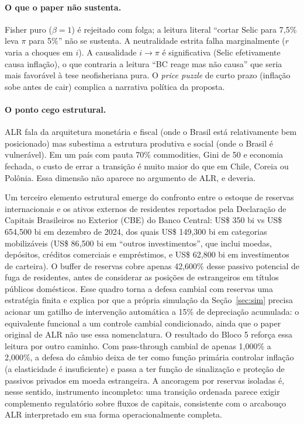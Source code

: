 \documentclass[11pt,a4paper]{article}
\begin{document}
\paragraph{O que o paper não sustenta.} Fisher puro ($\beta = 1$) é
rejeitado com folga; a leitura literal ``cortar Selic para 7{,}5\%
leva $\pi$ para 5\%'' não se sustenta. A neutralidade estrita falha
marginalmente ($r$ varia a choques em $i$). A causalidade $i \to \pi$
é significativa (Selic efetivamente causa inflação), o que contraria a
leitura ``BC reage mas não causa'' que seria mais favorável à tese
neofisheriana pura. O \emph{price puzzle} de curto prazo (inflação sobe
antes de cair) complica a narrativa política da proposta.

\paragraph{O ponto cego estrutural.} ALR fala da arquitetura monetária e
fiscal (onde o Brasil está relativamente bem posicionado) mas subestima
a estrutura produtiva e social (onde o Brasil é vulnerável). Em um país
com pauta 70\% commodities, Gini de 50 e economia fechada, o custo de
errar a transição é muito maior do que em Chile, Coreia ou Polônia.
Essa dimensão não aparece no argumento de ALR, e deveria.

Um terceiro elemento estrutural emerge do confronto entre o estoque de
reservas internacionais e os ativos externos de residentes reportados
pela Declaração de Capitais Brasileiros no Exterior (CBE) do Banco
Central: US\$ 350 bi vs US\$ 654{,}500 bi em dezembro de 2024, dos quais
US\$ 149{,}300 bi em categorias mobilizáveis (US\$ 86{,}500 bi em
``outros investimentos'', que inclui moedas, depósitos, créditos
comerciais e empréstimos, e US\$ 62{,}800 bi em investimentos de
carteira). O buffer de reservas cobre apenas 42{,}600\% desse passivo
potencial de fuga de residentes, antes de considerar as posições de
estrangeiros em títulos públicos domésticos. Esse quadro torna a defesa
cambial com reservas uma estratégia finita e explica por que a própria
simulação da Seção~\ref{sec:sim} precisa acionar um gatilho de
intervenção automática a 15\% de depreciação acumulada: o equivalente
funcional a um controle cambial condicionado, ainda que o paper original
de ALR não use essa nomenclatura. O resultado do Bloco 5 reforça essa
leitura por outro caminho. Com pass-through cambial de apenas
1{,}000\% a 2{,}000\%, a defesa do câmbio deixa de ter como função
primária controlar inflação (a elasticidade é insuficiente) e passa a
ter função de sinalização e proteção de passivos privados em moeda
estrangeira. A ancoragem por reservas isoladas é, nesse sentido,
instrumento incompleto: uma transição ordenada parece exigir
complemento regulatório sobre fluxos de capitais, consistente com o
arcabouço ALR interpretado em sua forma operacionalmente completa.
\end{document}
